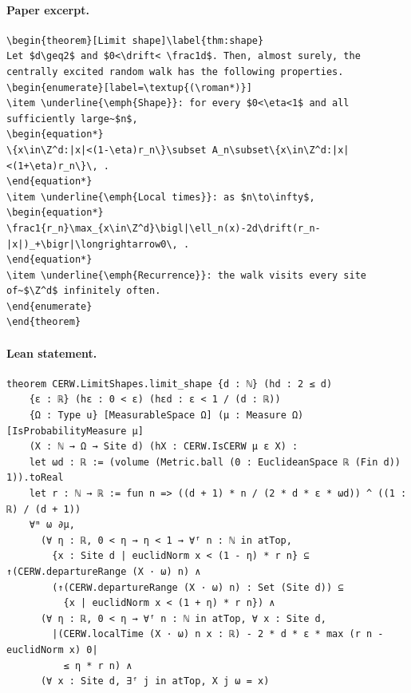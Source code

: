 \paragraph{Paper excerpt.}
\begin{verbatim}
\begin{theorem}[Limit shape]\label{thm:shape}
Let $d\geq2$ and $0<\drift< \frac1d$. Then, almost surely, the centrally excited random walk has the following properties.
\begin{enumerate}[label=\textup{(\roman*)}]
\item \underline{\emph{Shape}}: for every $0<\eta<1$ and all sufficiently large~$n$,
\begin{equation*}
\{x\in\Z^d:|x|<(1-\eta)r_n\}\subset A_n\subset\{x\in\Z^d:|x|<(1+\eta)r_n\}\, .
\end{equation*}
\item \underline{\emph{Local times}}: as $n\to\infty$,
\begin{equation*}
\frac1{r_n}\max_{x\in\Z^d}\bigl|\ell_n(x)-2d\drift(r_n-|x|)_+\bigr|\longrightarrow0\, .
\end{equation*}
\item \underline{\emph{Recurrence}}: the walk visits every site of~$\Z^d$ infinitely often.
\end{enumerate}
\end{theorem}
\end{verbatim}
\paragraph{Lean statement.}
\begin{verbatim}
theorem CERW.LimitShapes.limit_shape {d : ℕ} (hd : 2 ≤ d)
    {ε : ℝ} (hε : 0 < ε) (hεd : ε < 1 / (d : ℝ))
    {Ω : Type u} [MeasurableSpace Ω] (μ : Measure Ω) [IsProbabilityMeasure μ]
    (X : ℕ → Ω → Site d) (hX : CERW.IsCERW μ ε X) :
    let ωd : ℝ := (volume (Metric.ball (0 : EuclideanSpace ℝ (Fin d)) 1)).toReal
    let r : ℕ → ℝ := fun n => ((d + 1) * n / (2 * d * ε * ωd)) ^ ((1 : ℝ) / (d + 1))
    ∀ᵐ ω ∂μ,
      (∀ η : ℝ, 0 < η → η < 1 → ∀ᶠ n : ℕ in atTop,
        {x : Site d | euclidNorm x < (1 - η) * r n} ⊆ ↑(CERW.departureRange (X · ω) n) ∧
        (↑(CERW.departureRange (X · ω) n) : Set (Site d)) ⊆
          {x | euclidNorm x < (1 + η) * r n}) ∧
      (∀ η : ℝ, 0 < η → ∀ᶠ n : ℕ in atTop, ∀ x : Site d,
        |(CERW.localTime (X · ω) n x : ℝ) - 2 * d * ε * max (r n - euclidNorm x) 0|
          ≤ η * r n) ∧
      (∀ x : Site d, ∃ᶠ j in atTop, X j ω = x)
\end{verbatim}
